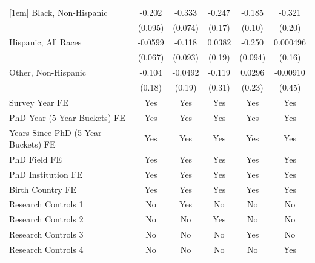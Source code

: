 \begin{table}[htbp]
\begin{tabular}{l*{5}{c}}
[1em]
Black, Non-Hispanic&      -0.202\sym{**} &      -0.333\sym{***}&      -0.247         &      -0.185\sym{*}  &      -0.321         \\
  &     (0.095)         &     (0.074)         &      (0.17)         &      (0.10)         &      (0.20)         \\
[1em]
Hispanic, All Races&     -0.0599         &      -0.118         &      0.0382         &      -0.250\sym{**} &    0.000496         \\
  &     (0.067)         &     (0.093)         &      (0.19)         &     (0.094)         &      (0.16)         \\
[1em]
Other, Non-Hispanic&      -0.104         &     -0.0492         &      -0.119         &      0.0296         &    -0.00910         \\
  &      (0.18)         &      (0.19)         &      (0.31)         &      (0.23)         &      (0.45)         \\
[1em]
Survey Year FE&         Yes         &         Yes         &         Yes         &         Yes         &         Yes         \\
[1em]
PhD Year (5-Year Buckets) FE&         Yes         &         Yes         &         Yes         &         Yes         &         Yes         \\
[1em]
Years Since PhD (5-Year Buckets) FE&         Yes         &         Yes         &         Yes         &         Yes         &         Yes         \\
[1em]
PhD Field FE&         Yes         &         Yes         &         Yes         &         Yes         &         Yes         \\
[1em]
PhD Institution FE&         Yes         &         Yes         &         Yes         &         Yes         &         Yes         \\
[1em]
Birth Country FE&         Yes         &         Yes         &         Yes         &         Yes         &         Yes         \\
\hline
Research Controls 1&          No         &         Yes         &          No         &          No         &          No         \\
Research Controls 2&          No         &          No         &         Yes         &          No         &          No         \\
Research Controls 3&          No         &          No         &          No         &         Yes         &          No         \\
Research Controls 4&          No         &          No         &          No         &          No         &         Yes         \\

\end{tabular}
\end{table}
